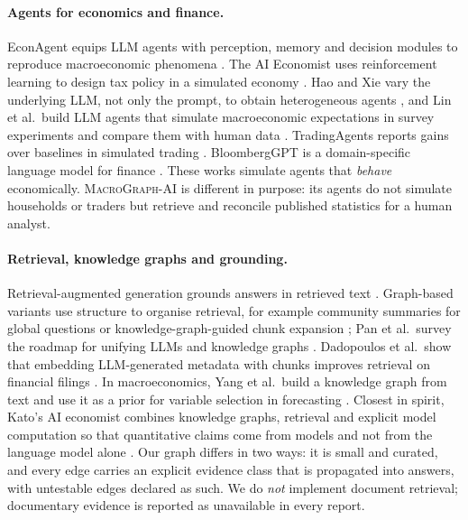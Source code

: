 \documentclass[conference]{IEEEtran}
\newcommand{\sys}{\textsc{MacroGraph-AI}}
\begin{document}
\paragraph{Agents for economics and finance.}
EconAgent equips LLM agents with perception, memory and decision modules to reproduce macroeconomic phenomena \cite{li2024econagent}. The AI Economist uses reinforcement learning to design tax policy in a simulated economy \cite{zheng2022aieconomist}. Hao and Xie vary the underlying LLM, not only the prompt, to obtain heterogeneous agents \cite{hao2025mlab}, and Lin et al.\ build LLM agents that simulate macroeconomic expectations in survey experiments and compare them with human data \cite{lin2026expectations}. TradingAgents reports gains over baselines in simulated trading \cite{xiao2024tradingagents}. BloombergGPT is a domain-specific language model for finance \cite{wu2023bloomberggpt}. These works simulate agents that \emph{behave} economically. \sys{} is different in purpose: its agents do not simulate households or traders but retrieve and reconcile published statistics for a human analyst.

\paragraph{Retrieval, knowledge graphs and grounding.}
Retrieval-augmented generation grounds answers in retrieved text \cite{lewis2020rag}. Graph-based variants use structure to organise retrieval, for example community summaries for global questions \cite{edge2024graphrag} or knowledge-graph-guided chunk expansion \cite{zhu2025kg2rag}; Pan et al.\ survey the roadmap for unifying LLMs and knowledge graphs \cite{pan2024llmkg}. Dadopoulos et al.\ show that embedding LLM-generated metadata with chunks improves retrieval on financial filings \cite{dadopoulos2025metadata}. In macroeconomics, Yang et al.\ build a knowledge graph from text and use it as a prior for variable selection in forecasting \cite{yang2020kgmacro}. Closest in spirit, Kato's AI economist combines knowledge graphs, retrieval and explicit model computation so that quantitative claims come from models and not from the language model alone \cite{kato2026aieconomist}. Our graph differs in two ways: it is small and curated, and every edge carries an explicit evidence class that is propagated into answers, with untestable edges declared as such. We do \emph{not} implement document retrieval; documentary evidence is reported as unavailable in every report.
\end{document}
